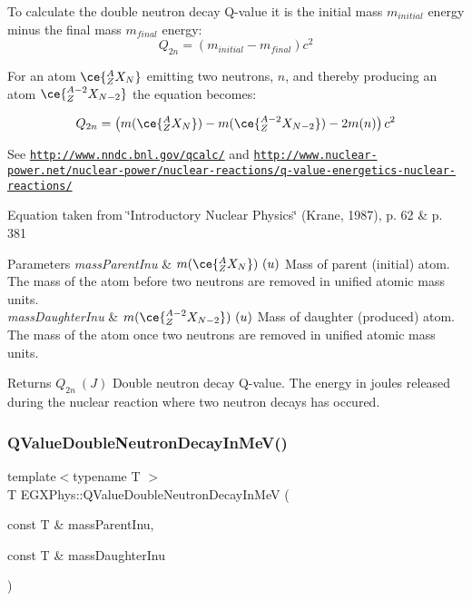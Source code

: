 To calculate the double neutron decay Q-\/value it is the initial mass $m_{initial}$ energy minus the final mass $m_{final}$ energy\+: \[Q_{2n} = \left ( m_{initial}-m_{final}\right ) c^2\]

For an atom $\ce{ ^{A}_{Z}X_{N} }$ emitting two neutrons, $n$, and thereby producing an atom $\ce{ ^{A-2}_{Z}X_{N-2} }$ the equation becomes\+:

\[Q_{2n} = \left ( m(\ce{ ^{A}_{Z}X_{N} }) - m(\ce{ ^{A-2}_{Z}X_{N-2} }) - 2m(n) \right ) c^2\]

See \href{http://www.nndc.bnl.gov/qcalc/}{\tt http\+://www.\+nndc.\+bnl.\+gov/qcalc/} and \href{http://www.nuclear-power.net/nuclear-power/nuclear-reactions/q-value-energetics-nuclear-reactions/}{\tt http\+://www.\+nuclear-\/power.\+net/nuclear-\/power/nuclear-\/reactions/q-\/value-\/energetics-\/nuclear-\/reactions/}

Equation taken from \char`\"{}\+Introductory Nuclear Physics\char`\"{} (Krane, 1987), p. 62 \& p. 381


\begin{DoxyParams}{Parameters}
{\em mass\+Parent\+Inu} & $m(\ce{ ^{A}_{Z}X_{N} })\ (u)$ Mass of parent (initial) atom. The mass of the atom before two neutrons are removed in unified atomic mass units. \\
\hline
{\em mass\+Daughter\+Inu} & $m(\ce{ ^{A-2}_{Z}X_{N-2} })\ (u)$ Mass of daughter (produced) atom. The mass of the atom once two neutrons are removed in unified atomic mass units. \\
\hline
\end{DoxyParams}
\begin{DoxyReturn}{Returns}
$Q_{2n}\ (J)$ Double neutron decay Q-\/value. The energy in joules released during the nuclear reaction where two neutron decays has occured. 
\end{DoxyReturn}
\mbox{\label{group___q_value_ga6bfea723aca78b32ea67cc1ca7b4031b}} 
\subsubsection{\texorpdfstring{Q\+Value\+Double\+Neutron\+Decay\+In\+Me\+V()}{QValueDoubleNeutronDecayInMeV()}}
{\footnotesize\ttfamily template$<$typename T $>$ \\
T E\+G\+X\+Phys\+::\+Q\+Value\+Double\+Neutron\+Decay\+In\+MeV (\begin{DoxyParamCaption}\item[{const T \&}]{mass\+Parent\+Inu,  }\item[{const T \&}]{mass\+Daughter\+Inu }\end{DoxyParamCaption})}




